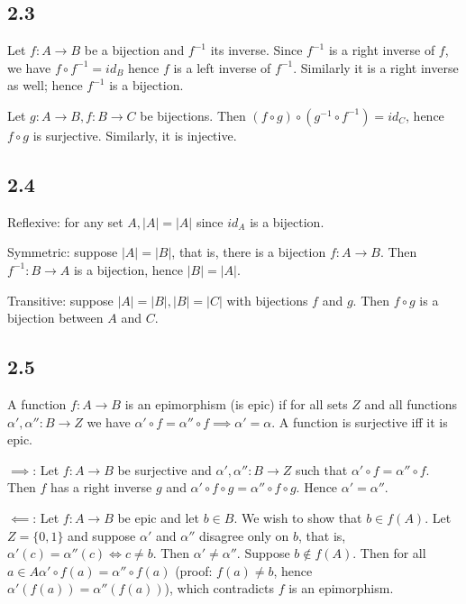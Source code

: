 \documentclass{article}
\begin{document}
\subsection*{2.3}

Let $f: A \to B$ be a bijection and $f^{-1}$ its inverse. Since $f^{-1}$ is a right inverse of $f$, we have $f \circ f^{-1} = id_B$ hence $f$ is a left inverse of $f^{-1}$. Similarly it is a right inverse as well; hence $f^{-1}$ is a bijection.

Let $g: A \to B, f: B \to C$ be bijections. Then $(f \circ g) \circ (g^{-1} \circ f^{-1}) = id_C$, hence $f \circ g$ is surjective. Similarly, it is injective.

\subsection*{2.4}

Reflexive: for any set $A, |A| = |A|$ since $id_A$ is a bijection.

Symmetric: suppose $|A| = |B|$, that is, there is a bijection $f: A \to B$. Then $f^{-1}: B \to A$ is a bijection, hence $|B| = |A|$.

Transitive: suppose $|A| = |B|, |B| = |C|$ with bijections $f$ and $g$. Then $f \circ g$ is a bijection between $A$ and $C$.

\subsection*{2.5}

A function $f: A \to B$ is an epimorphism (is epic) if for all sets $Z$ and all functions $\alpha', \alpha'': B \to Z$ we have $\alpha' \circ f = \alpha'' \circ f \implies \alpha' = \alpha$. A function is surjective iff it is epic.

$\implies$: Let $f: A \to B$ be surjective and $\alpha', \alpha'': B \to Z$ such that $\alpha' \circ f = \alpha'' \circ f$. Then $f$ has a right inverse $g$ and $\alpha' \circ f \circ g = \alpha'' \circ f \circ g$. Hence $\alpha' = \alpha''$.

$\impliedby$: Let $f: A \to B$ be epic and let $b \in B$. We wish to show that $b \in f(A)$. Let $Z = \{0, 1\}$ and suppose $\alpha'$ and $\alpha''$ disagree only on $b$, that is, $\alpha'(c) = \alpha''(c) \iff c \ne b$. Then $\alpha' \ne \alpha''$. Suppose $b \not\in f(A)$. Then for all $a \in A \alpha' \circ f(a) = \alpha'' \circ f(a)$ (proof: $f(a) \ne b$, hence $\alpha'(f(a)) = \alpha''(f(a))$), which contradicts $f$ is an epimorphism.
\end{document}
